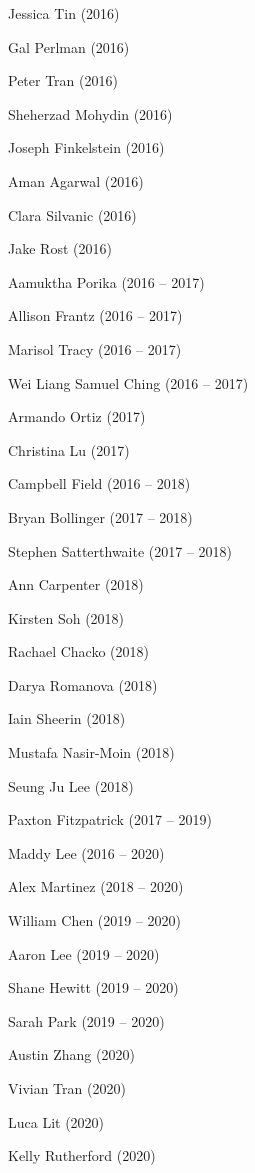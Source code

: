 \documentclass{tufte-book} %
\begin{document}
\begin{fullwidth}
\begin{multicols}{2}\raggedcolumns
\begin{list}{\quad}{}
\item Jessica Tin (2016)
\item Gal Perlman (2016)
\item Peter Tran (2016)
\item Sheherzad Mohydin (2016)
\item Joseph Finkelstein (2016)
\item Aman Agarwal (2016)
\item Clara Silvanic (2016)
\item Jake Rost (2016)
\item Aamuktha Porika (2016 -- 2017)
\item Allison Frantz (2016 -- 2017)
\item Marisol Tracy (2016 -- 2017)
\item Wei Liang Samuel Ching (2016 -- 2017)
\item Armando Ortiz (2017)
\item Christina Lu (2017)
\item Campbell Field (2016 -- 2018)
\item Bryan Bollinger (2017 -- 2018)
\item Stephen Satterthwaite (2017 -- 2018)
\item Ann Carpenter (2018)
\item Kirsten Soh (2018)
\item Rachael Chacko (2018)
\item Darya Romanova (2018)
\item Iain Sheerin (2018)
\item Mustafa Nasir-Moin (2018)
\item Seung Ju Lee (2018)
\item Paxton Fitzpatrick (2017 -- 2019)
\item Maddy Lee (2016 -- 2020)
\item Alex Martinez (2018 -- 2020)
\item William Chen (2019 -- 2020)
\item Aaron Lee (2019 -- 2020)
\item Shane Hewitt (2019 -- 2020)
\item Sarah Park (2019 -- 2020)
\item Austin Zhang (2020)
\item Vivian Tran (2020)
\item Luca Lit (2020)
\item Kelly Rutherford (2020)

\end{list}
\end{multicols}
\end{fullwidth}
\end{document}
